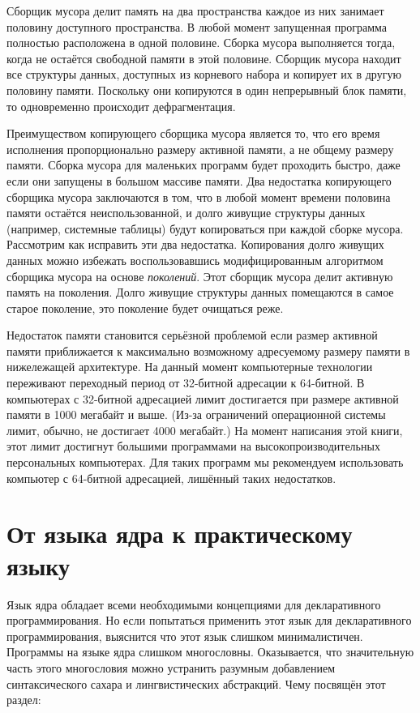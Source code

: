 Сборщик мусора делит память на два пространства каждое из них занимает половину доступного пространства. В любой момент запущенная программа полностью расположена в одной половине. Сборка мусора выполняется тогда, когда не остаётся свободной памяти в этой половине. Сборщик мусора находит все структуры данных, доступных из корневого набора и копирует их в другую половину памяти. Поскольку они копируются в один непрерывный блок памяти, то одновременно происходит дефрагментация.

Преимуществом копирующего сборщика мусора является то, что его время исполнения пропорционально размеру активной памяти, а не общему размеру памяти. Сборка мусора для маленьких программ будет проходить быстро, даже если они запущены в большом массиве памяти. Два недостатка копирующего сборщика мусора заключаются в том, что в любой момент времени половина памяти остаётся неиспользованной, и долго живущие структуры данных (например, системные таблицы) будут копироваться при каждой сборке мусора. Рассмотрим как исправить эти два недостатка. Копирования долго живущих данных можно избежать воспользовавшись модифицированным алгоритмом сборщика мусора на основе \emph{поколений}. Этот сборщик мусора делит активную память на поколения. Долго живущие структуры данных помещаются в самое старое поколение, это поколение будет очищаться реже.

Недостаток памяти становится серьёзной проблемой если размер активной памяти приближается к максимально возможному адресуемому размеру памяти в нижележащей архитектуре. На данный момент компьютерные технологии переживают переходный период от 32-битной адресации к 64-битной. В компьютерах с 32-битной адресацией лимит достигается при размере активной памяти в 1000 мегабайт и выше. (Из-за ограничений операционной системы лимит, обычно, не достигает 4000 мегабайт.) На момент написания этой книги, этот лимит достигнут большими программами на высокопроизводительных персональных компьютерах. Для таких программ мы рекомендуем использовать компьютер с 64-битной адресацией, лишённый таких недостатков.

\section{От языка ядра к практическому языку}

Язык ядра обладает всеми необходимыми концепциями для декларативного программирования. Но если попытаться применить этот язык для декларативного программирования, выяснится что этот язык слишком минималистичен. Программы на языке ядра слишком многословны. Оказывается, что значительную часть этого многословия можно устранить разумным добавлением синтаксического сахара и лингвистических абстракций. Чему посвящён этот раздел:

